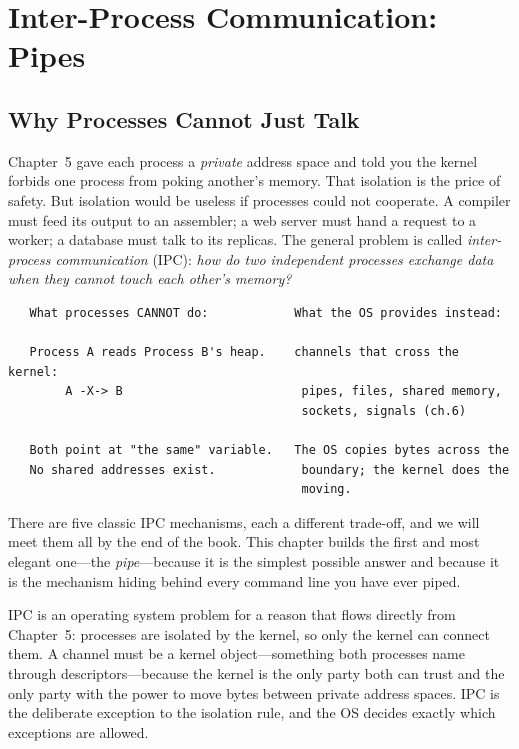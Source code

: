 
\chapter{Inter-Process Communication: Pipes}

\section{Why Processes Cannot Just Talk}

Chapter~5 gave each process a \emph{private} address space and told you
the kernel forbids one process from poking another's memory. That
isolation is the price of safety. But isolation would be useless if
processes could not cooperate. A compiler must feed its output to an
assembler; a web server must hand a request to a worker; a database
must talk to its replicas. The general problem is called
\emph{inter-process communication} (IPC): \emph{how do two independent
processes exchange data when they cannot touch each other's memory?}

\begin{verbatim}
   What processes CANNOT do:            What the OS provides instead:

   Process A reads Process B's heap.    channels that cross the kernel:
        A -X-> B                         pipes, files, shared memory,
                                         sockets, signals (ch.6)

   Both point at "the same" variable.   The OS copies bytes across the
   No shared addresses exist.            boundary; the kernel does the
                                         moving.
\end{verbatim}

There are five classic IPC mechanisms, each a different trade-off, and
we will meet them all by the end of the book. This chapter builds the
first and most elegant one---the \emph{pipe}---because it is the
simplest possible answer and because it is the mechanism hiding behind
every command line you have ever piped.

\begin{osconcept}
IPC is an operating system problem for a reason that flows directly
from Chapter~5: processes are isolated by the kernel, so only the
kernel can connect them. A channel must be a kernel object---something
both processes name through descriptors---because the kernel is the
only party both can trust and the only party with the power to move
bytes between private address spaces. IPC is the deliberate exception
to the isolation rule, and the OS decides exactly which exceptions are
allowed.
\end{osconcept}

